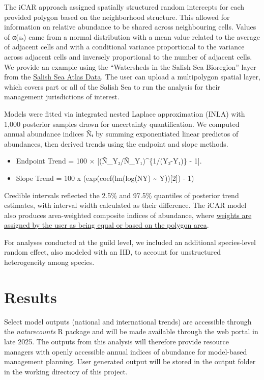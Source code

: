 \documentclass[
  letterpaper,
  DIV=11,
  numbers=noendperiod]{scrreprt}
\begin{document}
The iCAR approach assigned spatially structured random intercepts for
each provided polygon based on the neighborhood structure. This allowed
for information on relative abundance to be shared across neighbouring
cells. Values of α(sₐ) came from a normal distribution with a mean value
related to the average of adjacent cells and with a conditional variance
proportional to the variance across adjacent cells and inversely
proportional to the number of adjacent cells. We provide an example
using the ``Watersheds in the Salish Sea Bioregion'' layer from the
\href{https://salish-sea-atlas-data-wwu.hub.arcgis.com/}{Salish Sea
Atlas Data}. The user can upload a multipolygon spatial layer, which
covers part or all of the Salish Sea to run the analysis for their
management jurisdictions of interest.

Models were fitted via integrated nested Laplace approximation (INLA)
with 1,000 posterior samples drawn for uncertainty quantification. We
computed annual abundance indices Ñₜ by summing exponentiated linear
predictos of abundances, then derived trends using the endpoint and
slope methods.

\begin{itemize}
\item
  Endpoint Trend = 100 × {[}(Ñ\_Y₂/Ñ\_Y₁)\^{}\{1/(Y₂-Y₁)\} - 1{]}.
\item
  Slope Trend = 100 x (exp(coef(lm(log(NY) \textasciitilde{} Y)){[}2{]})
  - 1)
\end{itemize}

Credible intervals reflected the 2.5\% and 97.5\% quantiles of posterior
trend estimates, with interval width calculated as their difference. The
iCAR model also produces area-weighted composite indices of abundance,
where \hyperref[3.1.1Analysis]{weights are assigned by the user as being
equal or based on the polygon area}.

For analyses conducted at the guild level, we included an additional
species-level random effect, also modeled with an IID, to account for
unstructured heterogeneity among species.

\section{Results}\label{1.3Intro}

Select model outputs (national and international trends) are accessible
through the \emph{naturecounts} R package and will be made available
through the web portal in late 2025. The outputs from this analysis will
therefore provide resource managers with openly accessible annual
indices of abundance for model-based management planning. User generated
output will be stored in the output folder in the working directory of
this project.
\end{document}
